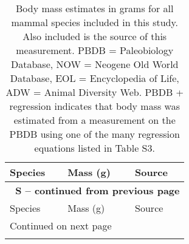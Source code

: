 \documentclass{article}
\renewcommand{\thetable}{S\arabic{table}}
\begin{document}
\small
\begin{center}
  \begin{longtable}{p{} p{} p{}}
    \caption[Mammal body mass estimates]{Body mass estimates in grams for all mammal species included in this study. Also included is the source of this measurement. PBDB = Paleobiology Database, NOW = Neogene Old World Database, EOL = Encyclopedia of Life, ADW = Animal Diversity Web. PBDB + regression indicates that body mass was estimated from a measurement on the PBDB using one of the many regression equations listed in Table S3.} \label{tab:mass_data} \\

    \hline Species & Mass (g) & Source \\ \hline
    \endfirsthead

    \multicolumn{3}{p{\textwidth}}{{ \bfseries \tablename\ \thetable{} -- continued from previous page}} \\
    \hline Species & Mass (g) & Source \\ \hline
    \endhead

    \hline \multicolumn{3}{p{\textwidth}}{{Continued on next page}} \\ \hline
    \endfoot


\end{longtable}
\end{center}
\end{document}
